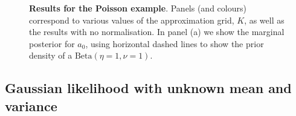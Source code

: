 \documentclass[a4paper, notitlepage, 11pt]{article}
\begin{document}
\begin{figure}[!ht]
\hfill
{}
\hfill
{}
\hfill
\caption{\textbf{Results for the Poisson example}.
Panels (and colours) correspond to various values of the approximation grid, $K$, as well as the results with no normalisation.
In panel (a) we show the marginal posterior for $a_0$, using horizontal dashed lines to show the prior density of a $\text{Beta}(\eta = 1, \nu = 1)$.
}
\label{fig:poisson}
\end{figure}

\subsection{Gaussian likelihood with unknown mean and variance}
\label{sec:gaussian_illus}
\end{document}
